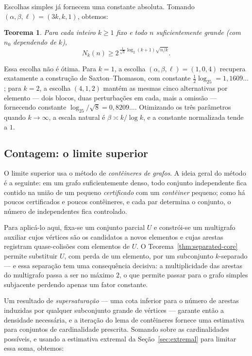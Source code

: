 \documentclass[11pt,a4paper]{article}
\newtheorem{theorem}{Teorema}[section]
\theoremstyle{definition}
\theoremstyle{remark}
\begin{document}
Escolhas simples já fornecem uma constante absoluta. Tomando
\((\alpha,\beta,\ell)=(3k,k,1)\), obtemos:

\begin{theorem}
  \label{thm:lower-count}
  Para cada inteiro \(k\geq1\) fixo e todo \(n\) suficientemente grande
  (com \(n_0\) dependendo de \(k\)),
  \[
    N_k(n)\geq2^{\,\frac1{\sqrt3}\log_2(k+1)\sqrt{n/k}} .
  \]
\end{theorem}

Essa escolha não é ótima. Para \(k=1\), a escolha
\((\alpha,\beta,\ell)=(1,0,4)\) recupera exatamente a construção de
Saxton--Thomason, com constante \(\tfrac12\log_25=1{,}1609\ldots\); para
\(k=2\), a escolha \((4,1,2)\) mantém as mesmas cinco alternativas por
elemento --- dois blocos, duas perturbações em cada, mais a omissão ---
fornecendo constante \(\log_25/\sqrt8=0{,}8209\ldots\). Otimizando os
três parâmetros quando \(k\to\infty\), a escala natural é
\(\beta\asymp k/\log k\), e a constante normalizada tende a \(1\).

\subsection{Contagem: o limite superior}
\label{sec:upper}

O limite superior usa o método de \emph{contêineres de grafos}. A ideia
geral do método é a seguinte: em um grafo suficientemente denso, todo
conjunto independente fica contido na união de um pequeno
\emph{certificado} com um \emph{contêiner} pequeno; como há poucos
certificados e poucos contêineres, e cada par determina o conjunto, o
número de independentes fica controlado.

Para aplicá-lo aqui, fixa-se um conjunto parcial \(U\) e constrói-se um
multigrafo auxiliar cujos vértices são os candidatos a novos elementos e
cujas arestas registram quase-colisões com elementos de \(U\). O
Teorema~\ref{thm:separated-core} permite substituir \(U\), com perda de
um elemento, por um subconjunto \(k\)-separado --- e essa separação tem
uma consequência decisiva: a multiplicidade das arestas do multigrafo
passa a ser no máximo \(2\), o que permite passar para o grafo simples
subjacente perdendo apenas um fator constante.

Um resultado de \emph{supersaturação} --- uma cota inferior para o
número de arestas induzidas por qualquer subconjunto grande de vértices
--- garante então a densidade necessária, e a iteração do lema de
contêineres fornece uma estimativa para conjuntos de cardinalidade
prescrita. Somando sobre as cardinalidades possíveis, e usando a
estimativa extremal da Seção~\ref{sec:extremal} para limitar essa soma,
obtemos:
\end{document}
